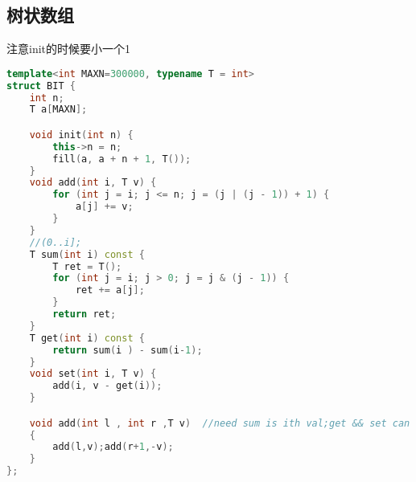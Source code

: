 \subsection{树状数组}
注意init的时候要小一个1
		\begin{lstlisting}[language=c++]
template<int MAXN=300000, typename T = int>
struct BIT {
	int n;
	T a[MAXN];

	void init(int n) {
		this->n = n;
		fill(a, a + n + 1, T());
	}
	void add(int i, T v) {
		for (int j = i; j <= n; j = (j | (j - 1)) + 1) {
			a[j] += v;
		}
	}
	//(0..i];
	T sum(int i) const { 
		T ret = T();
		for (int j = i; j > 0; j = j & (j - 1)) {
			ret += a[j];
		}
		return ret;
	}
	T get(int i) const {
		return sum(i ) - sum(i-1);
	}
	void set(int i, T v) {
		add(i, v - get(i));
	}

	void add(int l , int r ,T v)  //need sum is ith val;get && set can't use;
	{
		add(l,v);add(r+1,-v);
	}
}; 
	\end{lstlisting}